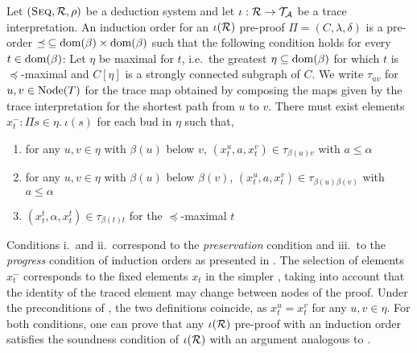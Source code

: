 \begin{definition}\label{def:io-abstract-b}
  Let $(\textsc{Seq}, \mathcal{R}, \rho)$ be a deduction system and let $\iota : \mathcal{R} \to
  \mathcal{T}_{\mathcal{A}}$ be a trace interpretation.
  An induction order for an $\iota(\mathcal{R})$ pre-proof $\Pi = (C, \lambda, \delta)$
  is a pre-order
  $\mathrel{\preceq}\: \subseteq
  \mathrm{dom}(\beta) \times \mathrm{dom} (\beta)$ such that
  the following
  condition holds for every $t \in \mathrm{dom}(\beta)$: Let $\eta$ be maximal for $t$,
  i.e.\ the greatest $\eta \subseteq \mathrm{dom}(\beta)$ for which $t$ is
  $\preceq$-maximal and $C[\eta]$ is a strongly connected subgraph of $C$.
  We write $\tau_{uv}$ for $u, v \in \mathrm{Node}(T)$ for the trace map obtained by
  composing the maps given by the trace interpretation for the shortest path
  from $u$ to $v$.
  There must exist elements $x_t^{-} : \Pi s \in \eta.~\iota(s)$ for each bud in
  $\eta$ such that,
  \begin{enumerate}[label=\roman*.]
  \item for any $u, v \in \eta$ with $\beta(u)$ below $v$, $(x_t^{u}, a, x_t^{v}) \in
    \tau_{\beta(u) v}$ with $a \leq \alpha$
  \item for any $u, v \in \eta$ with $\beta(u)$ below $\beta(v)$, $(x_t^u, a, x_t^v) \in
    \tau_{\beta(u) \beta(v)}$ with $a \leq \alpha$
  \item $(x_t^t, \alpha, x_t^t) \in \tau_{\beta(t) t}$ for the $\preceq$-maximal $t$
  \end{enumerate}
\end{definition}
Conditions i.~and
ii.~correspond to the \emph{preservation} condition and iii.~to the
\emph{progress} condition of induction orders as presented in .
The selection of elements $x_t^{-}$ corresponds to the fixed elements $x_t$ in
the simpler , taking into account that the identity of
the traced element may change between nodes of the proof.
Under the preconditions of , the two definitions
coincide, as $x_t^u = x_t^v$ for any $u, v \in \eta$. For both conditions, one
can prove that any $\iota(\mathcal{R})$ pre-proof with an induction order satisfies the
soundness condition of $\iota(\mathcal{R})$ with an argument analogous to .

